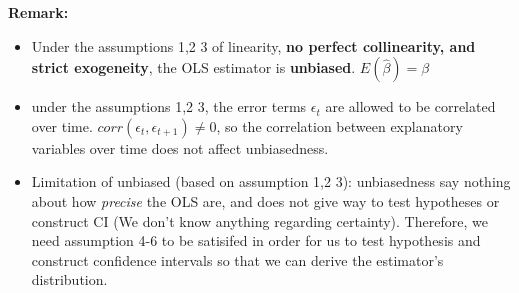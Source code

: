 \documentclass[12pt]{article}
\begin{document}
\noindent
{\color{ForestGreen}\textbf{Remark: }} 
\begin{itemize}
\begin{itemize}
\item
Under the assumptions 1,2 3 of linearity, \textbf{no perfect collinearity, and strict exogeneity}, the OLS estimator is \textbf{unbiased}. 
$E(\hat{\beta}) = \beta$
\item
under the assumptions 1,2 3, the error terms ${\epsilon_t}$ are allowed to be correlated over time. $corr(\epsilon_t, \epsilon_{t+1}) \ne 0 $, so the correlation between explanatory variables over time does not affect unbiasedness.
\item
Limitation of unbiased (based on assumption 1,2 3): unbiasedness say nothing about how \textit{precise} the OLS are, and does not give way to test hypotheses or construct CI (We don’t know anything regarding certainty). Therefore, we need assumption 4-6 to be satisifed in order for us to test hypothesis and construct confidence intervals so that we can derive the estimator’s distribution.
\end{itemize}
\end{itemize}
\end{document}

